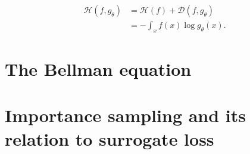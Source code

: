 \begin{equation}
\label{eq:cross_entropy}
\begin{aligned}
	\mathcal{H}(f,g_\theta) 	&= \mathcal{H}(f) + \mathcal{D}(f,g_\theta)\\
						&= - \int_{x} f(x) \log g_\theta(x).
\end{aligned}
\end{equation}

\section{The Bellman equation}

\section{Importance sampling and its relation to surrogate loss}
